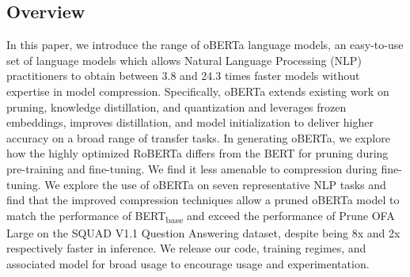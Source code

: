 \subsection{Overview}
In this paper, we introduce the range of oBERTa language models, an easy-to-use set of language models which allows Natural Language Processing (NLP) practitioners to obtain between 3.8 and 24.3 times faster models without expertise in model compression. Specifically, oBERTa extends existing work on pruning, knowledge distillation, and quantization and leverages frozen embeddings, improves distillation, and model initialization to deliver higher accuracy on a broad range of transfer tasks. In generating oBERTa, we explore how the highly optimized RoBERTa differs from the BERT for pruning during  pre-training and fine-tuning. We find it less amenable to compression during  fine-tuning. We explore the use of oBERTa on seven representative NLP tasks and find that the improved compression techniques allow a pruned oBERTa model to match the performance of BERT\textsubscript{base} and exceed the performance of Prune OFA Large on the SQUAD V1.1 Question Answering dataset, despite being 8x and 2x respectively faster in inference. We release our code, training regimes, and associated model for broad usage to encourage usage and experimentation. 
